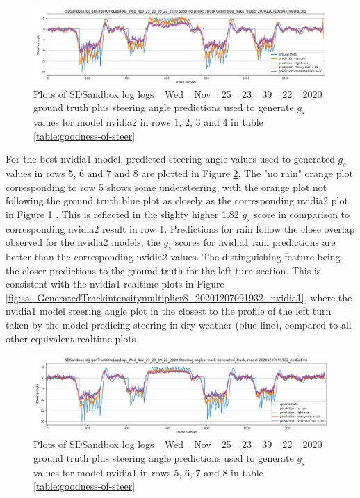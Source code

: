 

\begin{figure}[h!]
 \centering 
 \includegraphics[width=\textwidth]{Figures/sa_Generated_Track_20201207192948_nvidia2.h5.png}
 \caption{Plots of SDSandbox log logs\_ Wed\_ Nov\_ 25\_ 23\_ 39\_ 22\_ 2020 ground truth plus steering angle predictions used to generate $g_s$ values for model nvidia2 in rows 1, 2, 3 and 4 in table \ref{table:goodness-of-steer}}
 \label{fig:sa_Generated_Track_20201207192948_nvidia2.h5} 
\end{figure}

For the best nvidia1 model, predicted steering angle values used to generated $g_s$ values in rows 5, 6 and 7 and 8 are plotted in Figure \ref{fig:sa_Generated_Track_20201207091932_nvidia1.h5}. The "no rain" orange plot corresponding to row 5 shows some understeering, with the orange plot not following the ground truth blue plot as closely as the corresponding nvidia2 plot in Figure \ref{fig:sa_Generated_Track_20201207192948_nvidia2.h5} . This is reflected in the slighty higher 1.82 $g_s$ score in comparison to corresponding nvidia2 result in row 1. Predictions for rain follow the close overlap observed for the nvidia2 models, the $g_s$ scores for nvidia1 rain predictions are better than the corresponding nvidia2 values. The distinguishing feature being the closer predictions to the ground truth for the left turn section. This is consistent with the nvidia1 realtime plots in Figure  \ref{fig:sa_GeneratedTrackintensitymultiplier8_20201207091932_nvidia1}, where the nvidia1 model steering angle plot in the closest to the profile of the left turn taken by the model predicing steering in dry weather (blue line), compared to all other equivalent realtime plots.

\begin{figure}[h!]
 \centering 
 \includegraphics[width=\textwidth]{Figures/sa_Generated_Track_20201207091932_nvidia1.h5.png}
 \caption{Plots of SDSandbox log logs\_ Wed\_ Nov\_ 25\_ 23\_ 39\_ 22\_ 2020 ground truth plus steering angle predictions used to generate $g_s$ values for model nvidia1 in rows 5, 6, 7 and 8 in table \ref{table:goodness-of-steer}}
 \label{fig:sa_Generated_Track_20201207091932_nvidia1.h5} 
\end{figure}

